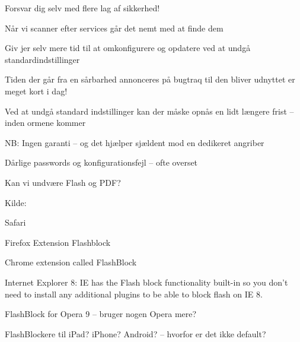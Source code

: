 \documentclass[20pt,landscape,a4paper,footrule]{foils}
\begin{document}


\centerline{Forsvar dig selv med flere lag af sikkerhed! }



\begin{list1}
\item Når vi scanner efter services går det nemt med at finde dem
\item Giv jer selv mere tid til at omkonfigurere og opdatere ved at undgå standardindstillinger
\item Tiden der går fra en sårbarhed annonceres på bugtraq til den
  bliver udnyttet er meget kort i dag!
\item Ved at undgå standard indstillinger kan der
  måske opnås en lidt længere frist -- inden ormene kommer
\item NB: Ingen garanti -- og det hjælper sjældent mod en dedikeret angriber
\item Dårlige passwords og konfigurationsfejl -- ofte overset
\end{list1}




\vskip 1cm
\centerline{Kan vi undvære Flash og PDF?}

Kilde: 




\begin{list1}
\item Safari 
\item Firefox Extension Flashblock
\item Chrome extension called FlashBlock
\item Internet Explorer 8: IE has the Flash block functionality built-in so you don't need to install any additional plugins to be able to block flash on IE 8.
\item FlashBlock for Opera 9 -- bruger nogen Opera mere?
\item FlashBlockere til iPad? iPhone? Android? -- hvorfor er det ikke default?
\end{list1}
\end{document}
